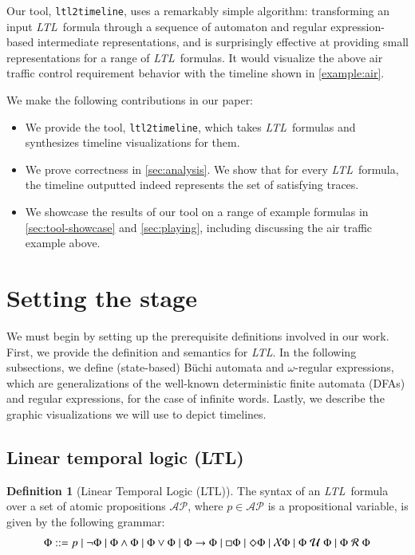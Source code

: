 \documentclass[preprint,12pt]{elsarticle}
\theoremstyle{definition}
\newtheorem{definition}{Definition}[section]
\theoremstyle{remark}
\newcommand{\AP}{\mathcal{AP}}
\newcommand{\always}{\Box}
\newcommand{\eventually}{\Diamond}
\newcommand{\nextt}{\mathcal{X}}
\newcommand{\limplies}{\rightarrow}
\newcommand{\ltl}{\textit{LTL}}
\newcommand{\Buchi}{B\"{u}chi }
\newcommand{\stronguntil}{\hspace{0.1cm} \mathcal{U}  \hspace{0.1cm}}
\newcommand{\weakrelease}{\hspace{0.1cm} \mathcal{R} \hspace{0.1cm}}
\newcommand{\tool}{\hspace{0.1cm}\texttt{ltl2timeline}\hspace{0.1cm}}
\begin{document}
Our tool, \tool, uses a remarkably simple algorithm: transforming an input \ltl\ formula through a sequence of automaton and regular expression-based intermediate representations, and is surprisingly effective at providing small representations for a range of \ltl\ formulas. It would visualize the above air traffic control requirement behavior with the timeline shown in \cref{example:air}.

We make the following contributions in our paper:
\begin{itemize}
    \item We provide the tool, \tool, which takes \ltl\ formulas and synthesizes timeline visualizations for them.
    \item We prove correctness in \cref{sec:analysis}. We show that for every \ltl\ formula, the timeline outputted indeed represents the set of satisfying traces.
    \item We showcase the results of our tool on a range of example formulas in \cref{sec:tool-showcase} and \cref{sec:playing}, including discussing the air traffic example above.
\end{itemize}

\section{Setting the stage}

We must begin by setting up the prerequisite definitions involved in our work.
First, we provide the definition and semantics for \ltl. In the following subsections, we define (state-based) \Buchi automata and $\omega$-regular expressions, which are generalizations of the well-known deterministic finite automata (DFAs) and regular expressions, for the case of infinite words. Lastly, we describe the graphic visualizations we will use to depict timelines.

\subsection{Linear temporal logic (LTL)} \label{sec:ltl}

\begin{definition}[Linear Temporal Logic (LTL)]
    The syntax of an \ltl\ formula over a set of atomic propositions $\AP$, where $p\in\AP$ is a propositional variable, is given by the following grammar:
    \begin{align*}
        \Phi ::= p \mid \neg \Phi \mid \Phi \land \Phi \mid \Phi \lor \Phi \mid \Phi \limplies \Phi \mid \always \Phi \mid \eventually \Phi \mid \nextt \Phi \mid \Phi \stronguntil \Phi \mid \Phi \weakrelease \Phi
    \end{align*}\label{ltl-defn}
\end{definition}
\end{document}
